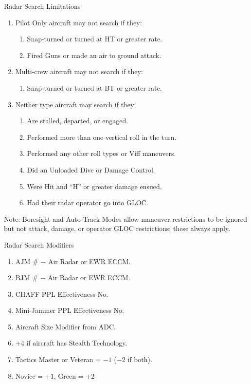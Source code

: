 \begin{table}
\centering
\caption{Radar Search Limitations}
\medskip
\begin{minipage}{\linewidth}
\begin{enumerate}
    \item Pilot Only aircraft may not search if they:
    \begin{enumerate}
        \item Snap-turned or turned at HT or greater rate.
        \item Fired Guns or made an air to ground attack.
    \end{enumerate}
    \item Multi-crew aircraft may not search if they:
    \begin{enumerate}
        \item Snap-turned or turned at BT or greater rate.
    \end{enumerate}    
    \item Neither type aircraft may search if they:
    \begin{enumerate}
        \item Are stalled, departed, or engaged.
        \item Performed more than one vertical roll in the turn.
        \item Performed any other roll types or Viff maneuvers.
        \item Did an Unloaded Dive or Damage Control.
        \item Were Hit and “H” or greater damage ensued.
        \item Had their radar operator go into GLOC.
    \end{enumerate}        
\end{enumerate}
\medskip
Note: Boresight and Auto-Track Modes allow maneuver restrictions to be ignored but not attack, damage, or operator GLOC restrictions; these always apply.
\end{minipage}
\end{table}

\begin{table}
\centering
\caption{Radar Search Modifiers}
\medskip
\begin{minipage}{\linewidth}
\begin{enumerate}
    \item AJM \# $-$ Air Radar or EWR ECCM.
    \item BJM \# $-$ Air Radar or EWR ECCM.
    \item CHAFF PPL Effectiveness No.
    \item Mini-Jammer PPL Effectiveness No.
    \item Aircraft Size Modifier from ADC.
    \item $+4$ if aircraft has Stealth Technology.
    \item Tactics Master or Veteran = $-1$ ($-2$ if both).
    \item Novice = $+1$, Green = $+2$
\end{enumerate}
\end{minipage}
\end{table}

